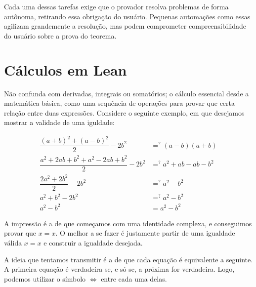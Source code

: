 \noindent Cada uma dessas tarefas exige que o provador resolva problemas de forma autônoma, retirando essa obrigação do usuário. Pequenas automações como essas agilizam grandemente a resolução, mas podem comprometer compreensibilidade do usuário sobre a prova do teorema.

\section{Cálculos em Lean}
Não confunda com derivadas, integrais ou somatórios; o cálculo essencial desde a matemática básica, como uma sequência de operações para provar que certa relação entre duas expressões. Considere o seguinte exemplo, em que desejamos mostrar a validade de uma iguldade:

\begin{equation*}
    \begin{aligned}
      \dfrac{(a+b)^2+(a-b)^2}{2}-2b^2 &=^? (a-b)(a+b)\\
      \dfrac{a^2+2ab+b^2+a^2-2ab+b^2}{2}-2b^2 &=^? a^2+ab-ab-b^2\\
      \dfrac{2a^2+2b^2}{2}-2b^2 &=^? a^2-b^2\\
      a^2+b^2-2b^2 &=^? a^2-b^2\\
      a^2-b^2 &= a^2-b^2
    \end{aligned}
\end{equation*}

\noindent A impressão é a de que começamos com uma identidade complexa, e conseguimos provar que $x=x$. O melhor a se fazer é justamente partir de uma igualdade válida $x=x$ e construir a igualdade desejada.



A ideia que tentamos transmitir é a de que cada equação é equivalente a seguinte. A primeira equação é verdadeira se, e só se, a próxima for verdadeira. Logo, podemos utilizar o símbolo $\iff$ entre cada uma delas.

